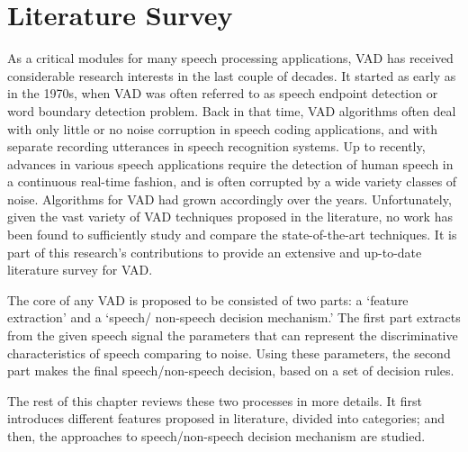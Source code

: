 \chapter{Literature Survey}
\label{chap:Literature-Survey}

As a critical modules for many speech processing applications, VAD has received considerable research interests in the last couple of decades. 
It started as early as in the 1970s, when VAD was often referred to as speech endpoint detection or word boundary detection problem. 
Back in that time, VAD algorithms often deal with only little or no noise corruption in speech coding applications, 
and with separate recording utterances in speech recognition systems. 
Up to recently, advances in various speech applications require the detection of human speech in a continuous real-time fashion, 
and is often corrupted by a wide variety classes of noise. Algorithms for VAD had grown accordingly over the years. 
Unfortunately, given the vast variety of VAD techniques proposed in the literature, no work has been found to sufficiently study and compare the state-of-the-art techniques. 
It is part of this research's contributions to provide an extensive and up-to-date literature survey for VAD.

The core of any VAD is proposed to be consisted of two parts: a `feature extraction' and a `speech/ non-speech decision mechanism.' 
The first part extracts from the given speech signal the parameters that can represent the discriminative characteristics of speech comparing to noise. 
Using these parameters, the second part makes the final speech/non-speech decision, based on a set of decision rules.

The rest of this chapter reviews these two processes in more details. 
It first introduces different features proposed in literature, divided into categories; and then, the approaches to speech/non-speech decision mechanism are studied.




